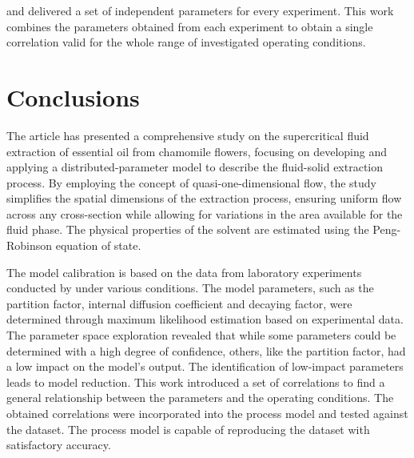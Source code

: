 \documentclass[a4paper,fleqn]{cas-dc}
\begin{document}
\citet{Povh2001} and \citet{Rahimi2011} delivered a set of independent parameters for every experiment. This work combines the parameters obtained from each experiment to obtain a single correlation valid for the whole range of investigated operating conditions.

\section{Conclusions} \label{CH: Conclusion}

The article has presented a comprehensive study on the supercritical fluid extraction of essential oil from chamomile flowers, focusing on developing and applying a distributed-parameter model to describe the fluid-solid extraction process. By employing the concept of quasi-one-dimensional flow, the study simplifies the spatial dimensions of the extraction process, ensuring uniform flow across any cross-section while allowing for variations in the area available for the fluid phase. The physical properties of the solvent are estimated using the Peng-Robinson equation of state.

The model calibration is based on the data from laboratory experiments conducted by \citet{Povh2001} under various conditions. The model parameters, such as the partition factor, internal diffusion coefficient and decaying factor, were determined through maximum likelihood estimation based on experimental data. The parameter space exploration revealed that while some parameters could be determined with a high degree of confidence, others, like the partition factor, had a low impact on the model's output. The identification of low-impact parameters leads to model reduction. This work introduced a set of correlations to find a general relationship between the parameters and the operating conditions. The obtained correlations were incorporated into the process model and tested against the dataset. The process model is capable of reproducing the dataset with satisfactory accuracy.


\newpage
%


\end{document}

